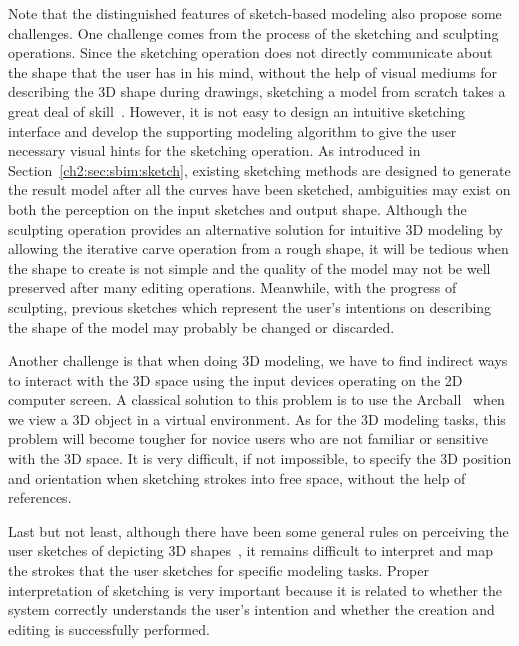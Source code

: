 Note that the distinguished features of sketch-based modeling also
propose some challenges. One challenge comes from the process of the
sketching and sculpting operations. Since the sketching operation
does not directly communicate about the shape that the user has in
his mind, without the help of visual mediums for describing the 3D
shape during drawings, sketching a model from scratch takes a great
deal of skill~\cite{CIW08}. However, it is not easy to design an
intuitive sketching interface and develop the supporting modeling
algorithm to give the user necessary visual hints for the sketching
operation. As introduced in Section~\ref{ch2:sec:sbim:sketch},
existing sketching methods are designed to generate the result model
after all the curves have been sketched, ambiguities may exist on
both the perception on the input sketches and output shape. Although
the sculpting operation provides an alternative solution for
intuitive 3D modeling by allowing the iterative carve operation from
a rough shape, it will be tedious when the shape to create is not
simple and the quality of the model may not be well preserved after
many editing operations. Meanwhile, with the progress of sculpting,
previous sketches which represent the user's intentions on
describing the shape of the model may probably be changed or
discarded.


Another challenge is that when doing 3D modeling, we have to find
indirect ways to interact with the 3D space using the input devices
operating on the 2D computer screen. A classical solution to this
problem is to use the Arcball~\cite{SK92} when we view a 3D object
in a virtual environment. As for the 3D modeling tasks, this problem
will become tougher for novice users who are not familiar or
sensitive with the 3D space. It is very difficult, if not
impossible, to specify the 3D position and orientation when
sketching strokes into free space, without the help of references.

Last but not least, although there have been  some general rules on
perceiving the user sketches of depicting 3D shapes~\cite{HD00}, it
remains difficult to interpret and map the strokes that the user
sketches for specific modeling tasks. Proper interpretation of
sketching is very important because it is related to whether the
system correctly understands the user's intention and whether the
creation and editing is successfully performed.

